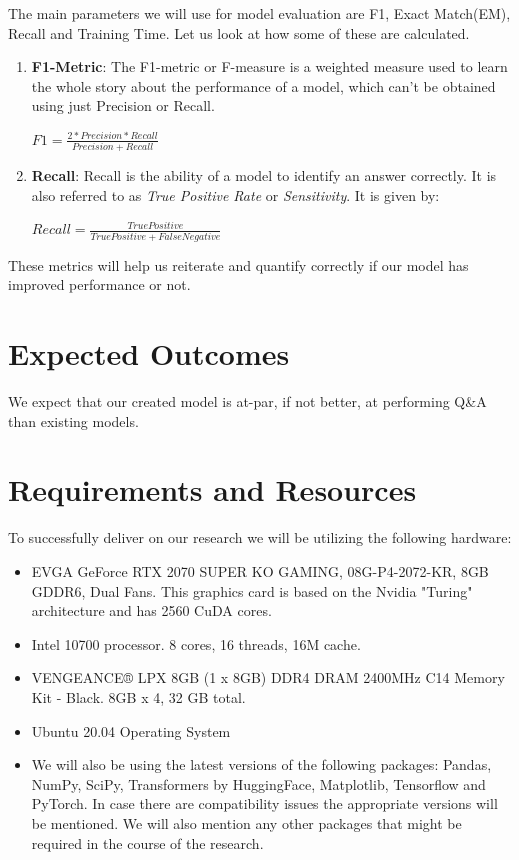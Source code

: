 \documentclass[11pt]{article}
\begin{document}
    The main parameters we will use for model evaluation are F1, Exact Match(EM), Recall and Training Time. Let us look at how some of these are calculated.
    
    \begin{enumerate}
    	\item \textbf{F1-Metric}: The F1-metric or F-measure is a weighted measure used to learn the whole story about the performance of a model, which can't be obtained using just Precision or Recall.
    	\begin{center}
    		$F1 = \frac{2*Precision*Recall}{Precision + Recall}$    		
    	\end{center}
    \item \textbf{Recall}: Recall is the ability of a model to identify an answer correctly. It is also referred to as \textit{True Positive Rate} or \textit{Sensitivity}. It is given by:
        	\begin{center}
    	$Recall = \frac{True Positive}{True Positive + False Negative}$    		
    \end{center}
    \end{enumerate}

    These metrics will help us reiterate and quantify correctly if our model has improved performance or not.

	\section{Expected Outcomes}\label{expectedoutcomes}

	We expect that our created model is at-par, if not better, at performing Q\&A than existing models.
	\section{Requirements and Resources}\label{resources}

	To successfully deliver on our research we will be utilizing the following hardware:
	\begin{itemize}
		\item EVGA GeForce RTX 2070 SUPER KO GAMING, 08G-P4-2072-KR, 8GB GDDR6, Dual Fans\citep{evga}. This graphics card is based on the Nvidia "Turing" architecture and has 2560 CuDA cores.
		\item Intel 10700 processor. 8 cores, 16 threads, 16M cache\citep{intel}.
		\item VENGEANCE® LPX 8GB (1 x 8GB) DDR4 DRAM 2400MHz C14 Memory Kit - Black\citep{Ram}. 8GB x 4, 32 GB total.
		\item Ubuntu 20.04 Operating System
		\item We will also be using the latest versions of the following packages: Pandas, NumPy, SciPy, Transformers by HuggingFace, Matplotlib, Tensorflow and PyTorch. In case there are compatibility issues the appropriate versions will be mentioned. We will also mention any other packages that might be required in the course of the research.
	\end{itemize}
\end{document}
